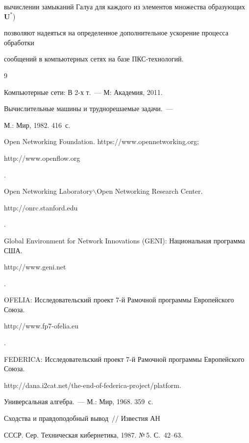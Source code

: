 вычислении замыканий Галуа для каждого из элементов множества образующих~$\mathbf{U}^*$) 

позволяют надеяться на определенное дополнительное ускорение процесса обработки 

сообщений в компьютерных сетях на базе ПКС-тех\-но\-логий.



 {\small\frenchspacing

{%


\begin{thebibliography}{9}




 Компьютерные сети: В 2-х т.~--- М: Академия, 2011.


 Вычислительные машины и труднорешаемые задачи.~--- 

М.: Мир, 1982. 416~с.


Open Networking Foundation. {\sf https://www.opennetworking.org}; {\sf 

http://www.\linebreak openflow.org}. 


Open Networking Laboratory$\backslash$Open Networking Research Center. {\sf 

http://onrc.\linebreak stanford.edu}.


Global Environment for Network Innovations (GENI): Национальная программа США. {\sf 

http://www.geni.net}.


OFELIA: Исследовательский проект 7-й Рамочной программы Европейского Союза. {\sf 

http://www.fp7-ofelia.eu}.


FEDERICA: Исследовательский проект 7-й Рамочной программы Европейского Союза. 

{\sf http://dana.i2cat.net/the-end-of-federica-project/platform}.




 Универсальная алгебра.~--- М.: Мир, 1968. 359~с.



 \label{end\stat}


 Сходства и правдоподобный вывод~/\!\!/ Известия АН 

СССР. Сер. Техническая кибернетика, 1987. №\,5. С.~42--63. 





 



 \end{thebibliography}

}

}

